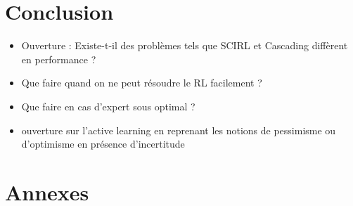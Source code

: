 \documentclass[11pt]{article}
\begin{document}
\section{Conclusion}
\label{sec-8}

\begin{itemize}
\item Ouverture : Existe-t-il des problèmes tels que SCIRL et Cascading diffèrent en performance ?
\item Que faire quand on ne peut résoudre le RL facilement ?
\item Que faire en cas d'expert sous optimal ?
\item ouverture sur l'active learning en reprenant les notions de pessimisme ou d'optimisme en présence d'incertitude
\end{itemize}
   
\section{Annexes}
\label{sec-9}
\end{document}
